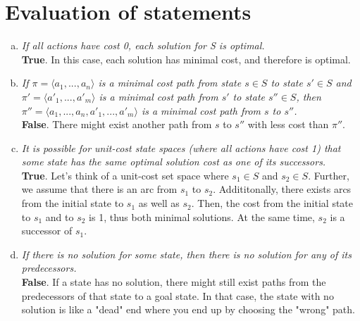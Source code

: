 \documentclass{article} %
\begin{document}
\section{Evaluation of statements}
\begin{enumerate}[(a)]
    \item \textit{If all actions have cost 0, each solution for S is
    optimal.}\\
    \textbf{True}. In this case, each solution has minimal cost, and therefore
    is optimal.
    \item \textit{If $\pi = \langle a_1, ... , a_n \rangle $ is a
    minimal cost path from state $s \in S$ to state $s' \in S$ and
    $\pi' = \langle a'_1, . . . , a'_m \rangle$ is a minimal cost
    path from $s'$ to state $s'' \in S$, then $\pi'' = \langle a_1,
    ... , a_n, a'_1, ... , a'_m \rangle$ is a minimal cost path
    from $s$ to $s''$.}\\
    \textbf{False}. There might exist another path from $s$ to $s''$ with less cost
    than $\pi''$.
    \item \textit{It is possible for unit-cost state spaces (where all
    actions have cost 1) that some state has the same optimal solution
    cost as one of its successors.}\\
    \textbf{True}. Let's think of a unit-cost set space where $s_1 \in S$ and
    $s_2 \in S$.
    Further, we assume that there is an arc from $s_1$ to $s_2$.
    Addititonally, there exists arcs from the initial state to $s_1$ as well
    as $s_2$.
    Then, the cost from the initial state to $s_1$ and to $s_2$ is 1,
    thus both minimal solutions.
    At the same time, $s_2$ is a successor of $s_1$.
    \item \textit{If there is no solution for some state, then there is
    no solution for any of its predecessors.}\\
    \textbf{False}. If a state has no solution, there might still exist paths from
    the predecessors of that state to a goal state. In that case, the state
    with no solution is like a "dead" end where you end up by choosing the
    "wrong" path.
\end{enumerate}
\end{document}
